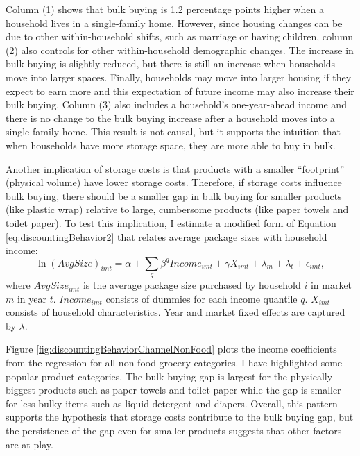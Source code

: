 \documentclass[AER]{AEA_mal}
\begin{document}
Column (1) shows that bulk buying is 1.2 percentage points higher when a household lives in a single-family home. However, since housing changes can be due to other within-household shifts, such as marriage or having children, column (2) also controls for other within-household demographic changes. The increase in bulk buying is slightly reduced, but there is still an increase when households move into larger spaces. Finally, households may move into larger housing if they expect to earn more and this expectation of future income may also increase their bulk buying. Column (3) also includes a household's one-year-ahead income and there is no change to the bulk buying increase after a household moves into a single-family home. This result is not causal, but it supports the intuition that when households have more storage space, they are more able to buy in bulk.

Another implication of storage costs is that products with a smaller ``footprint'' (physical volume) have lower storage costs. Therefore, if storage costs influence bulk buying, there should be a smaller gap in bulk buying for smaller products (like plastic wrap) relative to large, cumbersome products (like paper towels and toilet paper). To test this implication, I estimate a modified form of Equation \ref{eq:discountingBehavior2} that relates average package sizes with household income:
\begin{equation*}
\ln(AvgSize)_{imt} = \alpha + \sum_q \beta^q Income_{imt} + \gamma X_{imt} + \lambda_m + \lambda_t + \epsilon_{imt},
\end{equation*}
where $AvgSize_{imt}$ is the average package size purchased by household $i$ in market $m$ in year $t$. $Income_{imt}$ consists of dummies for each income quantile $q$. $X_{imt}$ consists of household characteristics. Year and market fixed effects are captured by $\lambda$.

Figure \ref{fig:discountingBehaviorChannelNonFood} plots the income coefficients from the regression for all non-food grocery categories. I have highlighted some popular product categories. The bulk buying gap is largest for the physically biggest products such as paper towels and toilet paper while the gap is smaller for less bulky items such as liquid detergent and diapers. Overall, this pattern supports the hypothesis that storage costs contribute to the bulk buying gap, but the persistence of the gap even for smaller products suggests that other factors are at play.
\end{document}
